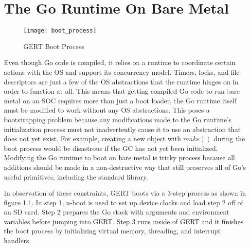 \chapter{The Go Runtime On Bare Metal}

\begin{figure}[h]
\begin{center}
  \texttt{[image: boot\_process]}
\end{center}
  \caption{GERT Boot Process} \label{fig:boot}
\end{figure}

Even though Go code is compiled, it relies on a runtime to coordinate certain actions with the OS and support its concurrency model.
Timers, locks, and file descriptors are just a few of the OS abstractions that the runtime hinges on
in order to function at all. This means that getting compiled Go code to run bare metal on an SOC requires
more than just a boot loader, the Go runtime itself must be modified to work without any OS abstractions.
This poses a bootstrapping problem because any modifications made to the Go runtime's initialization
process must not inadvertently cause it to use an abstraction that does not yet exist. For example,
creating a new object with $make()$ during the boot process would be disastrous if the GC has not yet been initialized.
Modifying the Go runtime to boot on bare metal is tricky process because all additions should be made
in a non-destructive way that still preserves all of Go's useful primitives, including the standard library.


In observation of these constraints, GERT boots via a 3-step process as shown in  figure \ref{fig:boot}.
In step 1, u-boot is used to set up device clocks and load step 2 off of an SD card. Step 2 prepares the
Go stack with arguments and environment variables before jumping into GERT. Step 3 runs inside of GERT and it
finishes the boot process by initializing virtual memory, threading, and interrupt handlers.







